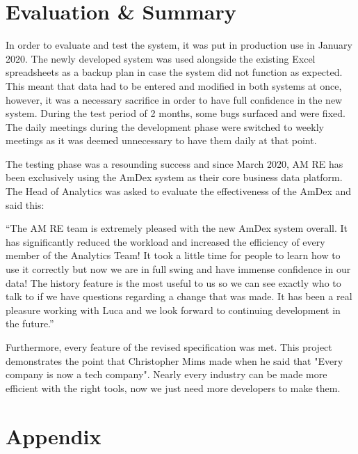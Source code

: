 \documentclass[12pt]{article}
\begin{document}
\section{Evaluation \& Summary}
In order to evaluate and test the system, it was put in production use in January 2020. The newly developed system was used alongside the existing Excel spreadsheets as a backup plan in case the system did not function as expected. This meant that data had to be entered and modified in both systems at once, however, it was a necessary sacrifice in order to have full confidence in the new system. During the test period of 2 months, some bugs surfaced and were fixed. The daily meetings during the development phase were switched to weekly meetings as it was deemed unnecessary to have them daily at that point.

The testing phase was a resounding success and since March 2020, AM RE has been exclusively using the AmDex system as their core business data platform. The Head of Analytics was asked to evaluate the effectiveness of the AmDex and said this:

\enquote{The AM RE team is extremely pleased with the new AmDex system overall. It has significantly reduced the workload and increased the efficiency of every member of the Analytics Team! It took a little time for people to learn how to use it correctly but now we are in full swing and have immense confidence in our data! The history feature is the most useful to us so we can see exactly who to talk to if we have questions regarding a change that was made. It has been a real pleasure working with Luca and we look forward to continuing development in the future.}

Furthermore, every feature of the revised specification was met. This project demonstrates the point that Christopher Mims made when he said that "Every company is now a tech company"\cite{mims_2018}. Nearly every industry can be made more efficient with the right tools, now we just need more developers to make them.




\newpage
\section{Appendix}
\end{document}
